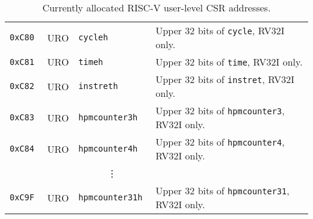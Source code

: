 \begin{table}[htb!]
\begin{center}
\begin{tabular}{|l|l|l|l|}
\tt 0xC80 & URO  &\tt cycleh        & Upper 32 bits of {\tt cycle}, RV32I only. \\
\tt 0xC81 & URO  &\tt timeh         & Upper 32 bits of {\tt time}, RV32I only. \\
\tt 0xC82 & URO  &\tt instreth      & Upper 32 bits of {\tt instret}, RV32I only. \\
\tt 0xC83 & URO  &\tt hpmcounter3h  & Upper 32 bits of {\tt hpmcounter3}, RV32I only. \\
\tt 0xC84 & URO  &\tt hpmcounter4h  & Upper 32 bits of {\tt hpmcounter4}, RV32I only. \\
& & \multicolumn{1}{c|}{\vdots} & \ \\
\tt 0xC9F & URO  &\tt hpmcounter31h & Upper 32 bits of {\tt hpmcounter31}, RV32I only. \\
\hline
\end{tabular}
\end{center}
\caption{Currently allocated RISC-V user-level CSR addresses.}
\label{ucsrnames}
\end{table}

